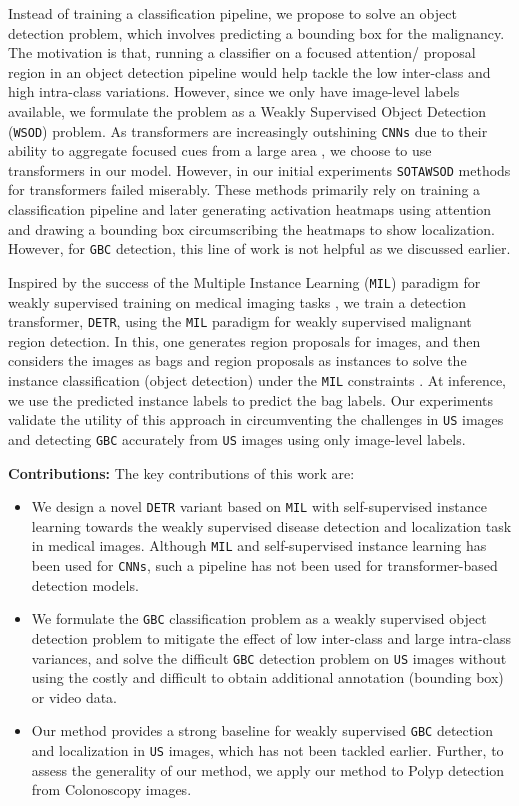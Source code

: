 \documentclass[runningheads]{llncs}
\newcommand{\myfirstpara}[1]{\par \noindent \textbf{#1:}}
\newcommand{\mypara}[1]{ \myfirstpara{#1}}
\def\cnns{\texttt{CNNs}\xspace}
\def\sota{\texttt{SOTA}\xspace}
\def\gbc{\texttt{GBC}\xspace}
\def\us{\texttt{US}\xspace}
\def\wsod{\texttt{WSOD}\xspace}
\def\mil{\texttt{MIL}\xspace}
\def\detr{\texttt{DETR}\xspace}
\begin{document}
Instead of training a classification pipeline, we propose to solve an object detection problem, which involves predicting a bounding box for the malignancy. The motivation is that, running a classifier on a focused attention/ proposal region in an object detection pipeline would help tackle the low inter-class and high intra-class variations. However, since we only have image-level labels available, we formulate the problem as a Weakly Supervised Object Detection (\wsod) problem. As transformers are increasingly outshining \cnns due to their ability to aggregate focused cues from a large area \cite{vit,detr}, we choose to use transformers in our model. However, in our initial experiments \sota \wsod methods for transformers failed miserably. These methods primarily rely on training a classification pipeline and later generating activation heatmaps using attention and drawing a bounding box circumscribing the heatmaps \cite{tscam,scm} to show localization. However, for \gbc detection, this line of work is not helpful as we discussed earlier. 

Inspired by the success of the Multiple Instance Learning (\mil) paradigm for weakly supervised training on medical imaging tasks \cite{transmil,swinmil}, we train a detection transformer, \detr, using the \mil paradigm for weakly supervised malignant region detection. In this, one generates region proposals for images, and then considers the images as bags and region proposals as instances to solve the instance classification (object detection) under the \mil constraints \cite{dietterich1997solving}. At inference, we use the predicted instance labels to predict the bag labels. Our experiments validate the utility of this approach in circumventing the challenges in \us images and detecting \gbc accurately from \us images using only image-level labels.

\mypara{Contributions} The key contributions of this work are:
\begin{itemize}%
\itemsep0em
	\item  We design a novel \detr variant based on \mil with self-supervised instance learning towards the weakly supervised disease detection and localization task in medical images. Although \mil and self-supervised instance learning has been used for \cnns \cite{oicr}, such a pipeline has not been used for transformer-based detection models.  
    \item We formulate the \gbc classification problem as a weakly supervised object detection problem to mitigate the effect of low inter-class and large intra-class variances, and solve the difficult \gbc detection problem on \us images without using the costly and difficult to obtain additional annotation (bounding box) or video data.
	\item Our method provides a strong baseline for weakly supervised \gbc detection and localization in \us images, which has not been tackled earlier. Further, to assess the generality of our method, we apply our method to Polyp detection from Colonoscopy images.
\end{itemize}
\end{document}
